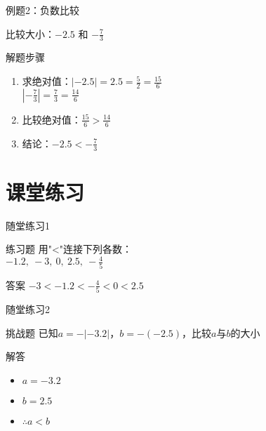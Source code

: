 \documentclass[aspectratio=169]{ctexbeamer}
\begin{document}
\begin{frame}{例题2：负数比较}
    \begin{example}
        比较大小：$-2.5$ 和 $-\frac{7}{3}$
    \end{example}
    
    \pause
    \begin{block}{解题步骤}
        \begin{enumerate}
            \item 求绝对值：$| -2.5 | = 2.5 = \frac{5}{2} = \frac{15}{6}$\\
            $| -\frac{7}{3} | = \frac{7}{3} = \frac{14}{6}$
            \item 比较绝对值：$\frac{15}{6} > \frac{14}{6}$
            \item 结论：$-2.5 < -\frac{7}{3}$
        \end{enumerate}
    \end{block}
\end{frame}

\section{课堂练习}
\begin{frame}{随堂练习1}
    \begin{block}{练习题}
        用"<"连接下列各数：\\
        $-1.2,\ -3,\ 0,\ 2.5,\ -\frac{4}{5}$
    \end{block}
    
    \pause
    \begin{alertblock}{答案}
        $-3 < -1.2 < -\frac{4}{5} < 0 < 2.5$
    \end{alertblock}
\end{frame}

\begin{frame}{随堂练习2}
    \begin{block}{挑战题}
        已知$a = -|-3.2|$，$b = -(-2.5)$，比较$a$与$b$的大小
    \end{block}
    
    \pause
    \begin{alertblock}{解答}
        \begin{itemize}
            \item $a = -3.2$
            \item $b = 2.5$
            \item $\therefore a < b$
        \end{itemize}
    \end{alertblock}
\end{frame}
\end{document}
